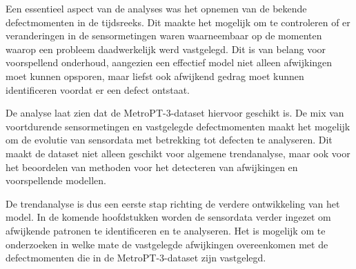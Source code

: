 Een essentieel aspect van de analyses was het opnemen van de bekende defectmomenten in de tijdsreeks. Dit maakte het mogelijk om te controleren of er veranderingen in de sensormetingen waren waarneembaar op de momenten waarop een probleem daadwerkelijk werd vastgelegd. Dit is van belang voor voorspellend onderhoud, aangezien een effectief model niet alleen afwijkingen moet kunnen opsporen, maar liefst ook afwijkend gedrag moet kunnen identificeren voordat er een defect ontstaat.

De analyse laat zien dat de MetroPT-3-dataset hiervoor geschikt is. De mix van voortdurende sensormetingen en vastgelegde defectmomenten maakt het mogelijk om de evolutie van sensordata met betrekking tot defecten te analyseren. Dit maakt de dataset niet alleen geschikt voor algemene trendanalyse, maar ook voor het beoordelen van methoden voor het detecteren van afwijkingen en voorspellende modellen.

De trendanalyse is dus een eerste stap richting de verdere ontwikkeling van het model. In de komende hoofdstukken worden de sensordata verder ingezet om afwijkende patronen te identificeren en te analyseren. Het is mogelijk om te onderzoeken in welke mate de vastgelegde afwijkingen overeenkomen met de defectmomenten die in de MetroPT-3-dataset zijn vastgelegd.




